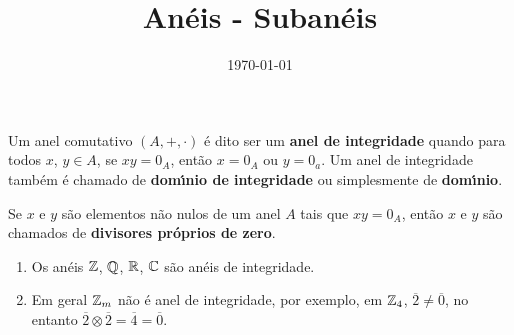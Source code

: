 \documentclass{beamer}
\title{Anéis - Subanéis}
\author[\autor]{\autor}
\institute[\instituto]{\instituto}
\date{\today}
\begin{document}
    \begin{frame}
        \maketitle
    \end{frame}

    
    \begin{frame}
        \begin{definicao}
            Um anel comutativo $(A, + , \cdot)$ {\'e} dito ser um \textbf{anel de integridade} quando para todos 
            $x$, $y \in A$, se $xy = 0_A$, ent{\~a}o $x = 0_A$ ou $y = 0_a$. Um anel de integridade tamb{\'e}m {\'e} chamado de \textbf{dom{\'\i}nio de integridade} ou simplesmente de \textbf{dom{\'\i}nio}.
        \end{definicao}

        \begin{observacao}
            Se $x$ e $y$ s{\~a}o elementos n{\~a}o nulos de um anel $A$ tais que $xy = 0_A$, ent{\~a}o $x$ e $y$ s{\~a}o chamados de \textbf{divisores pr{\'o}prios de zero}.
        \end{observacao}
    \end{frame}

    \begin{frame}
        \begin{exemplos}
            \begin{enumerate}[label={\arabic*})]
                \item Os an{\'e}is $\mathbb{Z}$, $\mathbb{Q}$, $\mathbb{R}$, $\mathbb{C}$ s{\~a}o an{\'e}is de integridade.
                
                \vspace{.5cm}

                \item Em geral $\mathbb{Z}_m$ n{\~a}o {\'e} anel de integridade, por exemplo, em $\mathbb{Z}_4$, $\overline{2} \neq \overline{0}$, no entanto $\overline{2}\otimes \overline{2} = \overline{4} = \overline{0}$.

                \vspace{.5cm}

                \seti
            \end{enumerate}
        \end{exemplos}
    \end{frame}
\end{document}
